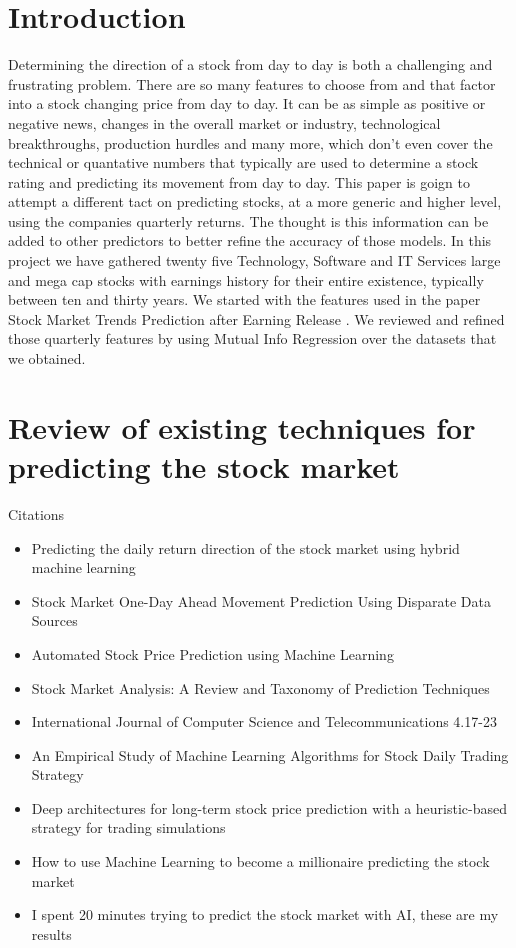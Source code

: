 \documentclass[conference]{IEEEtran}
\begin{document}
\section{Introduction}
Determining the direction of a stock from day to day is both a challenging and frustrating problem.  There are so many features to choose from and that factor into a stock changing price from day to day. It can be as simple as positive or negative news, changes in the overall market or industry, technological breakthroughs, production hurdles and many more, which don't even cover the technical or quantative numbers that typically are used to determine a stock rating and predicting its movement from day to day.  This paper is goign to attempt a different tact on predicting stocks, at a more generic and higher level, using the companies quarterly returns.  The thought is this information can be added to other predictors to better refine the accuracy of those models.  In this project we have gathered twenty five Technology, Software and IT Services large and mega cap stocks with earnings history for their entire existence, typically between ten and thirty years.  We started with the features used in the paper Stock Market Trends Prediction after Earning Release  \cite{QuarterlyPrediction}.  We reviewed and refined those quarterly features by using Mutual Info Regression over the datasets that we obtained.


\section{Review of existing techniques for predicting the stock market}


Citations
\begin{itemize}
\item Predicting the daily return direction of the stock market using hybrid machine learning\cite{DailyReturnDirection}
\item Stock Market One-Day Ahead Movement Prediction Using Disparate Data Sources\cite {Onedayahead}
\item Automated Stock Price Prediction using Machine Learning \cite{AutomatedPrediction}
\item Stock Market Analysis: A Review and Taxonomy of Prediction Techniques \cite{TaxonomyofPrediction}
\item International Journal of Computer Science and Telecommunications 4.17-23 \cite {MLModelPrediction}
\item An Empirical Study of Machine Learning Algorithms for Stock Daily Trading Strategy \cite{EmpiricalStudy}
\item Deep architectures for long-term stock price prediction with a heuristic-based strategy for trading simulations \cite{LongTermPricePrediction}
\item How to use Machine Learning to become a millionaire predicting the stock market \cite{WebBecomeMillionaire}
\item I spent 20 minutes trying to predict the stock market with AI, these are my results \cite{20MinStockPredict}
\end{itemize}
\end{document}
